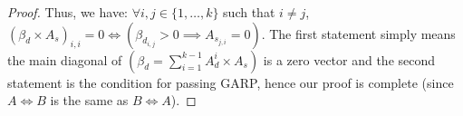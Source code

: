 \documentclass{article} %
\theoremstyle{style1}
\theoremstyle{example}
\begin{document}
\begin{proof}
Thus, we have: $\forall i, j\in\{1,\ldots,k\}$ such that $i\not=j$, $(\beta_d\times A_s)_{i,i}=0 \iff (\beta_{d_{i,j}}>0 \implies A_{s_{j,i}}=0)$. The first statement simply means the main diagonal of $(\beta_d=\sum_{i=1}^{k-1}A_{d}^{i}\times A_s)$ is a zero vector and the second statement is the condition for passing GARP, hence our proof is complete (since $A\iff B$ is the same as $B\iff A$).
\end{proof}



\end{document}
